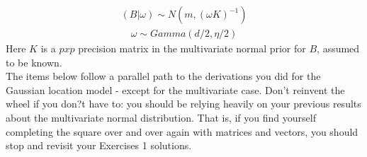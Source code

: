 \documentclass{homework}
\begin{document}
\begin{equation} \begin{split}
(B | \omega) \sim N(m,(\omega K)^{-1}) 
\end{split}\end{equation}
\begin{equation} \begin{split}
\omega \sim Gamma(d/2, \eta/2) 
\end{split}\end{equation}
Here $K$ is a $p x p$ precision matrix in the multivariate normal prior for $B$, assumed to be known.\\
The items below follow a parallel path to the derivations you did for the Gaussian location model - except for the multivariate case. Don't reinvent the wheel if you don?t have to: you should be relying heavily on your previous results about the multivariate normal distribution.   That is, if you find yourself completing the square over and over again with matrices and vectors, you should stop and revisit your Exercises 1 solutions.\\
\end{document}

